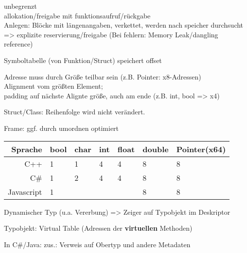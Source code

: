  unbegrenzt\\
 allokation/freigabe mit funktionsaufruf/rückgabe\\
 Anlegen: Blöcke mit längenangaben, verkettet, werden nach speicher durchsucht\\
=> explizite reservierung/freigabe (Bei fehlern: Memory Leak/dangling reference)

 Symboltabelle (von Funktion/Struct) speichert offset

 Adresse muss durch Größe teilbar sein (z.B. Pointer: x8-Adressen)\\
 Alignment vom größten Element; \\padding auf nächste Alignte größe, auch am ende (z.B. {int, bool} => x4) 

Struct/Class: Reihenfolge wird nicht verändert.

Frame: ggf. durch umordnen optimiert

\begin{tabular}{|r|l|l|l|l|l|l|}
\hline
Sprache & bool & char & int & float & double & Pointer(x64) \\ 
\hline
C++ & 1&1 & 4 &4&8&8\\
\hline
C\# & 1&2 & 4 &4&8&8\\
\hline
Javascript & 1 &&&&8&8\\
\hline
\end{tabular}


 









Dynamischer Typ (u.a. Vererbung) => Zeiger auf Typobjekt im Deskriptor

Typobjekt: Virtual Table (Adressen der \textbf{virtuellen} Methoden)

In C\#/Java: zus.: Verweis auf Obertyp und andere Metadaten
